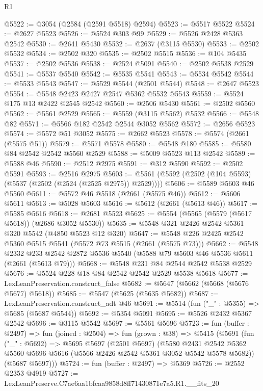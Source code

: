 \begin{lexlean}{R1}
\begin{coremodule}
@5522 := @3054 (@2584 (@2591 @5518) @2594)
@5523 := @5517 @5522
@5524 := @2627 @5523
@5526 := @5524 @303 @99
@5529 := @5526 @2428 @5363 @2542
@5530 := @2641 @5430
@5532 := @2637 (@3115 @5530)
@5533 := @2502 @5532
@5534 := @2502 @320
@5535 := @2502 @5515
@5536 := @104 @5435
@5537 := @2502 @5536
@5538 := @2524 @5091
@5540 := @2502 @5538 @2529
@5541 := @5537 @5540
@5542 := @5535 @5541
@5543 := @5534 @5542
@5544 := @5533 @5543
@5547 := @5529 @5544 (@2501 @5544)
@5548 := @2647 @5523
@5554 := @5548 @2423 @2427 @2547 @5362 @5532 @5543
@5559 := @5524 @175 @13 @2422 @2545 @2542
@5560 := @2506 @5430
@5561 := @2502 @5560
@5562 := @5561 @2529
@5565 := @5559 (@3115 @5562) @5532
@5566 := @5548 @82
@5571 := @5566 @182 @2542 @2544 @3052 @5562
@5572 := @2656 @5523
@5574 := @5572 @51 @3052
@5575 := @2662 @5523
@5578 := @5574 (@2661 (@5575 @51))
@5579 := @5571 @5578
@5580 := @5548 @180
@5585 := @5580 @84 @2542 @2542 @5560 @2529
@5588 := @5009 @5523 @113 @2542
@5589 := @5588 @46
@5590 := @2512 @2975
@5591 := @312 @5590
@5592 := @2502 @5591
@5593 := @2516 @2975
@5603 := @5561 (@5592 (@2502 (@104 @5593) (@5537 (@2502 (@2524 (@2525 @2975)) @2529))))
@5606 := @5589 @5603 @46 @5560
@5611 := @5572 @46 @5518 (@2661 (@5575 @46))
@5612 := @5606 @5611
@5613 := @5028 @5603
@5616 := @5612 (@2661 (@5613 @46))
@5617 := @5585 @5616
@5618 := @2681 @5523
@5625 := @5554 (@5565 (@5579 (@5617 @5618)) (@2686 @3052 @5530))
@5635 := @5548 @321 @2426 @2542 @5361 @320 @5542 (@4850 @5523 @12 @320)
@5647 := @5548 @226 @2425 @2542 @5360 @5515 @5541 (@5572 @73 @5515 (@2661 (@5575 @73)))
@5662 := @5548
    @2332
    @233
    @2542
    @2872
    @5536
    @5540
    (@5588 @79 @5603 @46 @5536 @5611 (@2661 (@5613 @79)))
@5668 := @5548 @231 @84 @2544 @2542 @5538 @2529
@5676 := @5524 @228 @18 @84 @2542 @2542 @2529 @5538 @5618
@5677 := LexLeanPreservation.construct_false
@5682 := @5647 (@5662 (@5668 (@5676 @5677) @5618))
@5685 := @5547 (@5625 (@5635 @5682))
@5687 := LexLeanPreservation.construct_adt @46
@5691 := @5514 (fun ("_" : @5355) => @5685 (@5687 @5544))
@5692 := @5354 @5091
@5695 := @5526 @2432 @5367 @2542
@5696 := @3115 @5542
@5697 := @5561 @5696
@5723 := fun (buffer : @2497) =>
  fun (joined : @2504) =>
  fun (grown : @38) =>
  @5415
    (@5691
      (fun ("_" : @5692) =>
      @5695
        @5697
        (@2501 @5697)
        (@5580
          @2431
          @2542
          @5362
          @5560
          @5696
          @5616
          (@5566 @2426 @2542 @5361 @3052 @5542 @5578 @5682))
        (@5687 @5697)))
@5724 := fun (buffer : @2497) => @5369
@5726 := @2552 @2353 @4919
@5727 := LexLeanPreserve.C7ae6aa1bfcaa9858d8ff71430871e7a5.R1.__fits_20

\end{coremodule}
\end{lexlean}

